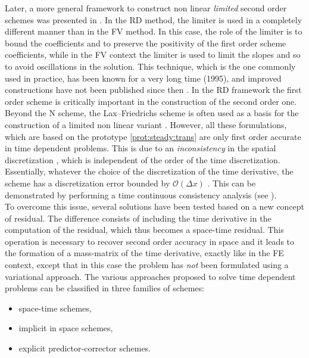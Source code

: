Later, a more general framework to construct non linear \textit{limited} second order
schemes was presented in \cite{paillere_multidimensional_1995,abgrall_high_2003,abgrall_construction_2004}.
In the RD method, the limiter is used in a completely different manner than in the FV method.
In this case, the role of the limiter is to bound the coefficients and to preserve the positivity
of the first order scheme coefficients, while in the FV context the limiter is
used to limit the slopes and so to avoid oscillations in the solution. 
This technique, which is the one commonly used in practice, has been known
for a very long time (1995), and improved constructions have not been published since then \cite{stein_residual_2007}. 
In the RD framework the first order scheme is critically important in the construction
of the second order one. Beyond the N scheme, the Lax–Friedrichs scheme is often used as a basis
for the construction of a limited non linear variant
\cite{abgrall_essentially_2006,ricchiuto_stabilized_2009,ricchiuto_explicit_2010,ricchiuto_explicit_2015}. 
However, all these formulations, which are based on the prototype \eqref{prot:steady:trans} are only first order
accurate in time dependent problems.
This is due to an \textit{inconsistency} in the spatial discretization \cite{stein_residual_2007}, which is independent
of the order of the time discretization. Essentially, whatever the choice of the discretization of the time
derivative, the scheme has a discretization error bounded by $\mathcal{O}(\Delta x)$ \cite{ricchiuto_contributions_2011}.
This can be demonstrated by performing a time continuous consistency analysis (see \cite{stein_residual_2007,ricchiuto_application_2007}).\\
To overcome this issue, several solutions have been tested based on a new concept of residual.
The difference consists of including the time derivative in the computation of the residual, which thus becomes
a space-time residual. This operation is necessary to recover second order accuracy in space
and it leads to the formation of a mass-matrix of the time derivative, exactly
like in the FE context, except that in this case the problem has \textit{not} been formulated using a variational approach.
The various approaches proposed to solve time dependent problems can be classified in three families of schemes:
\begin{itemize}
 \item space-time schemes,
 \item implicit in space schemes,
 \item explicit predictor-corrector schemes.
\end{itemize}
